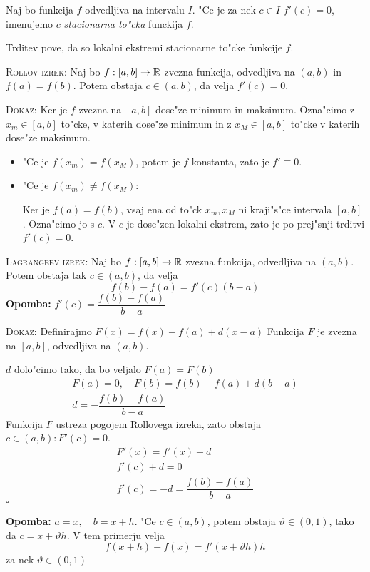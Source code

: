  Naj bo funkcija $f$ odvedljiva na intervalu $I$. "Ce je za nek $c \in I$ $f'(c) = 0$, imenujemo $c$ \emph{stacionarna to"cka} funckija $f$.

Trditev pove, da so lokalni ekstremi stacionarne to"cke funkcije $f$.

\textsc{Rollov izrek:} Naj bo $f: [a, b] \to \mathbb{R}$ zvezna funkcija, odvedljiva na $(a, b)$ in $f(a) = f(b)$. Potem obstaja $c \in (a, b)$, da velja $f'(c) = 0$.

\textsc{Dokaz:} Ker je $f$ zvezna na $[a, b]$ dose"ze minimum in maksimum. Ozna"cimo z $x_m \in [a, b]$ to"cke, v katerih dose"ze minimum in z $x_M \in [a, b]$ to"cke v katerih dose"ze maksimum.
\begin{itemize}
	\item "Ce je $f(x_m) = f(x_M)$, potem je $f$ konstanta, zato je $f' \equiv 0$.
	
	\item "Ce je $f(x_m) \neq f(x_M)$:
	
	Ker je $f(a) = f(b)$, vsaj ena od to"ck $x_m, x_M$ ni kraji"s"ce intervala $[a, b]$. Ozna"cimo jo s $c$. V $c$ je dose"zen lokalni ekstrem, zato je po prej"snji trditvi $f'(c) = 0$.
\end{itemize}
%
\textsc{Lagrangeev izrek:} Naj bo $f: [a, b] \to \mathbb{R}$ zvezna funkcija, odvedljiva na $(a, b)$. Potem obstaja tak $c \in (a, b)$, da velja
\begin{equation*}
f(b) - f(a) = f'(c) (b-a)
\end{equation*}
\textbf{Opomba:} $f'(c) = \dfrac{f(b) - f(a)}{b - a}$

\textsc{Dokaz:} Definirajmo $F(x) = f(x) - f(a) + d(x - a)$ Funkcija $F$ je zvezna na $[a, b]$, odvedljiva na $(a, b)$.

$d$ dolo"cimo tako, da bo veljalo $F(a) = F(b)$
\begin{gather*}
F(a) = 0, \quad F(b) = f(b) - f(a) + d(b - a) \\
d = - \dfrac{f(b) - f(a)}{b - a}
\end{gather*}
Funkcija $F$ ustreza pogojem Rollovega izreka, zato obstaja $c \in (a, b): F'(c) = 0$.
\begin{gather*}
F'(x) = f'(x) + d \\
f'(c) + d = 0 \\
 f'(c) = -d = \dfrac{f(b) - f(a)}{b - a}
\end{gather*}
\hfill $\square$

\textbf{Opomba:} $a = x, \quad b = x+h$. "Ce $c \in (a, b)$, potem obstaja $\vartheta \in (0, 1)$, tako da $c = x + \vartheta h$. V tem primerju velja
\begin{equation*}
f(x + h) - f(x) = f'(x + \vartheta h) h
\end{equation*}
za nek $\vartheta \in (0, 1)$

